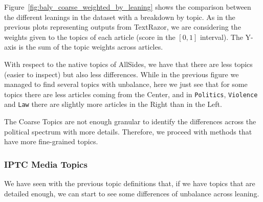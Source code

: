 Figure~\ref{fig:baly_coarse_weighted_by_leaning} shows the comparison between the different leanings in the dataset with a breakdown by topic.
%
As in the previous plots representing outputs from TextRazor, we are considering the weights given to the topics of each article (score in the $[0,1]$ interval). The Y-axis is the sum of the topic weights across articles.

With respect to the native topics of AllSides, we have that there are less topics (easier to inspect) but also less differences.
While in the previous figure we managed to find several topics with unbalance, here we just see that for some topics there are less articles coming from the Center, and in \texttt{Politics}, \texttt{Violence} and \texttt{Law} there are slightly more articles in the Right than in the Left.

The Coarse Topics are not enough granular to identify the differences across the political spectrum with more details.
Therefore, we proceed with methods that have more fine-grained topics.






\subsubsection{\statusgreen IPTC Media Topics}

We have seen with the previous topic definitions that, if we have topics that are detailed enough, we can start to see some differences of unbalance across leaning.

